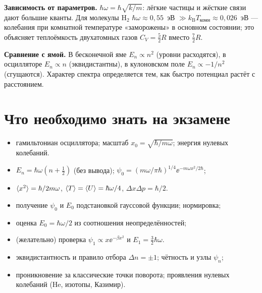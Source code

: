 \textbf{Зависимость от параметров.} $\hbar\omega=\hbar\sqrt{k/m}$: лёгкие частицы и жёсткие связи дают
большие кванты. Для молекулы H$_2$ $\hbar\omega\approx0{,}55$~эВ $\gg k_{\mathrm B}T_{\text{комн}}\approx0{,}026$~эВ —
колебания при комнатной температуре «заморожены» в основном состоянии; это объясняет
теплоёмкость двухатомных газов $C_V=\frac52R$ вместо $\frac72R$.

\textbf{Сравнение с ямой.} В бесконечной яме $E_n\propto n^2$ (уровни расходятся), в осцилляторе
$E_n\propto n$ (эквидистантны), в кулоновском поле $E_n\propto-1/n^2$ (сгущаются). Характер спектра
определяется тем, как быстро потенциал растёт с расстоянием.

\section{Что необходимо знать на экзамене}

\begin{examcheck}
\begin{itemize}
 \item гамильтониан осциллятора; масштаб $x_0=\sqrt{\hbar/m\omega}$; энергия нулевых колебаний.
\end{itemize}
\begin{itemize}
 \item $E_n=\hbar\omega(n+\frac12)$ (без вывода); $\psi_0=(m\omega/\pi\hbar)^{1/4}\ee^{-m\omega x^2/2\hbar}$;
 \item $\langle x^2\rangle=\hbar/2m\omega$, $\langle T\rangle=\langle U\rangle=\hbar\omega/4$, $\Delta x\Delta p=\hbar/2$.
\end{itemize}
\begin{itemize}
 \item получение $\psi_0$ и $E_0$ подстановкой гауссовой функции; нормировка;
 \item оценка $E_0=\hbar\omega/2$ из соотношения неопределённостей;
 \item (желательно) проверка $\psi_1\propto x\ee^{-\beta x^2}$ и $E_1=\frac32\hbar\omega$.
\end{itemize}
\begin{itemize}
 \item эквидистантность и правило отбора $\Delta n=\pm1$; чётность и узлы $\psi_n$;
 \item проникновение за классические точки поворота; проявления нулевых колебаний (He, изотопы, Казимир).
\end{itemize}
\end{examcheck}
